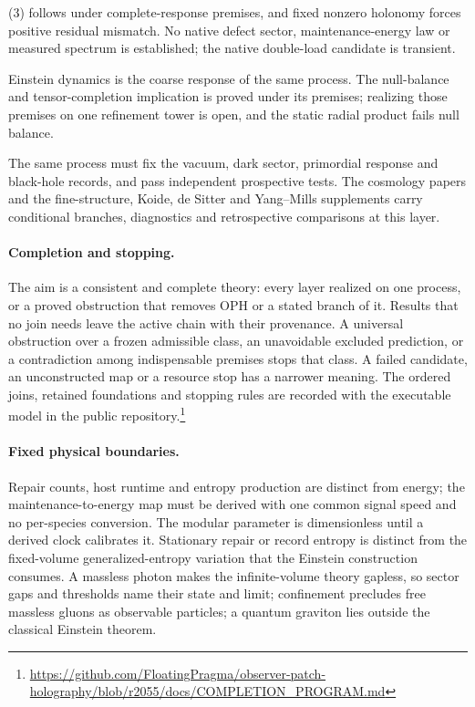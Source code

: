 \begin{description}
  (3)\) follows under complete-response premises, and fixed
  nonzero holonomy forces positive residual mismatch. No native defect
  sector, maintenance-energy law or measured spectrum is established; the
  native double-load candidate is transient.
\item[6. Gravity.] Einstein dynamics is the coarse response of the same
  process. The null-balance and tensor-completion implication is proved
  under its premises; realizing those premises on one refinement tower is
  open, and the static radial product fails null balance.
\item[7. Cosmology and tests.] The same process must fix the vacuum, dark
  sector, primordial response and black-hole records, and pass independent
  prospective tests. The cosmology papers and the fine-structure, Koide,
  de Sitter and Yang--Mills supplements carry conditional branches,
  diagnostics and retrospective comparisons at this layer.
\end{description}

\paragraph{Completion and stopping.}
The aim is a consistent and complete theory: every layer realized on one
process, or a proved obstruction that removes OPH or a stated branch of it.
Results that no join needs leave the active chain with their provenance. A
universal obstruction over a frozen admissible class, an unavoidable
excluded prediction, or a contradiction among indispensable premises stops
that class. A failed candidate, an unconstructed map or a resource stop has a
narrower meaning. The ordered joins, retained foundations and stopping
rules are recorded with the executable model in the public
repository.\footnote{\url{https://github.com/FloatingPragma/observer-patch-holography/blob/r2055/docs/COMPLETION_PROGRAM.md}}

\paragraph{Fixed physical boundaries.}
Repair counts, host runtime and entropy production are distinct from
energy; the maintenance-to-energy map must be derived with one common
signal speed and no per-species conversion. The modular parameter is
dimensionless until a derived clock calibrates it. Stationary repair or
record entropy is distinct from the fixed-volume generalized-entropy
variation that the Einstein construction consumes. A massless photon makes
the infinite-volume theory gapless, so sector gaps and thresholds name their
state and limit; confinement precludes free massless gluons as observable
particles; a quantum graviton lies outside the classical Einstein theorem.
